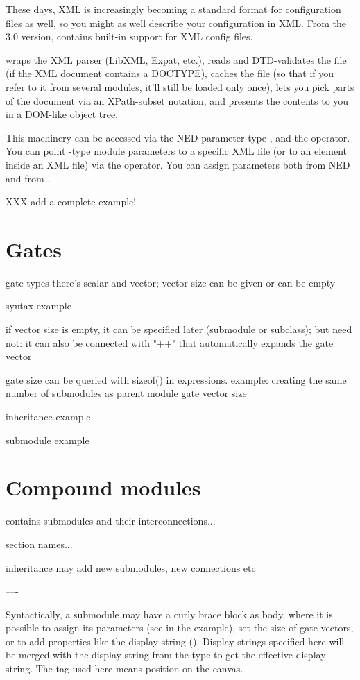 These days, XML is increasingly becoming a standard format for configuration
files as well, so you might as well describe your configuration in XML.
From the 3.0 version, {\opp} contains built-in support for XML config files.

{\opp} wraps the XML parser (LibXML, Expat, etc.), reads and DTD-validates
the file (if the XML document contains a DOCTYPE), caches the file
(so that if you refer to it from several modules, it'll still be loaded
only once), lets you pick parts of the document via an XPath-subset notation,
and presents the contents to you in a DOM-like object tree.

This machinery can be accessed via the NED parameter type , and the
 operator. You can point -type module parameters
to a specific XML file (or to an element inside an XML file) via the
 operator. You can assign  parameters both from NED
and from .

XXX add a complete example!


\section{Gates}

gate types
there's scalar and vector; vector size can be given or can be empty

syntax example

if vector size is empty, it can be specified later (submodule or subclass);
but need not: it can also be connected with "++" that automatically expands
the gate vector

gate size can be queried with sizeof() in expressions. example: creating the
same number of submodules as parent module gate vector size

inheritance example

submodule example




\section{Compound modules}

contains submodules and their interconnections...

section names...

inheritance may add new submodules, new connections etc

----

Syntactically, a submodule may have a curly brace block as body, where
it is possible to assign its parameters (see  in the example),
set the size of gate vectors, or to add properties like the display string
(). Display strings specified here will be merged with the
display string from the type to get the effective display string.
The  tag used here means position on the canvas.

